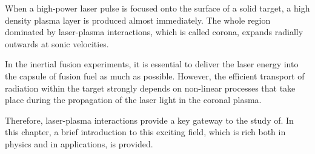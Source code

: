When a high-power laser pulse is focused onto the surface of a solid target, a high density plasma layer is produced almost immediately. The whole region dominated by laser-plasma interactions, which is called corona, expands radially outwards at sonic velocities.

In the inertial fusion experiments, it is essential to deliver the laser energy into the capsule of fusion fuel as much as possible. However, the efficient transport of radiation within the target strongly depends on non-linear processes that take place during the propagation of the laser light in the coronal plasma. 

Therefore, laser-plasma interactions provide a key gateway to the study of. In this chapter, a brief introduction to this exciting field, which is rich both in physics and in applications, is provided. 
